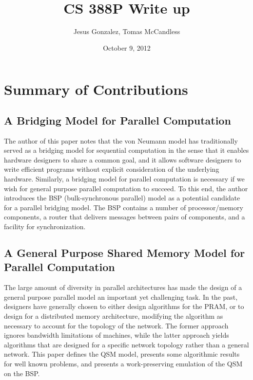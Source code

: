 \documentclass[12pt,a4paper]{article}
\author{Jesus Gonzalez, Tomas McCandless}
\title{CS 388P Write up}
\date{October 9, 2012}
\begin{document}
\maketitle
{}
\doublespace
\newpage


\section{Summary of Contributions}

\subsection{A Bridging Model for Parallel Computation}
The author of this paper notes that the von Neumann model has traditionally served as a bridging model for sequential computation in the sense that it
enables hardware designers to share a common goal, and it allows software designers to write efficient programs without explicit consideration of the
underlying hardware. Similarly, a bridging model for parallel computation is necessary if we wish for general purpose parallel computation to succeed.
To this end, the author introduces the BSP (bulk-synchronous parallel) model as a potential candidate for a parallel bridging model. The BSP contains a
number of processor/memory components, a router that delivers messages between pairs of components, and a facility for synchronization.

\subsection{A General Purpose Shared Memory Model for Parallel Computation}
The large amount of diversity in parallel architectures has made the design of a general purpose parallel model an important yet challenging task. In
the past, designers have generally chosen to either design algorithms for the PRAM, or to design for a distributed memory architecture, modifying the
algorithm as necessary to account for the topology of the network. The former approach ignores bandwidth limitations of machines, while the latter
approach yields algorithms that are designed for a specific network topology rather than a general network. This paper defines the QSM model, presents
some algorithmic results for well known problems, and presents a work-preserving emulation of the QSM on the BSP.
\end{document}

